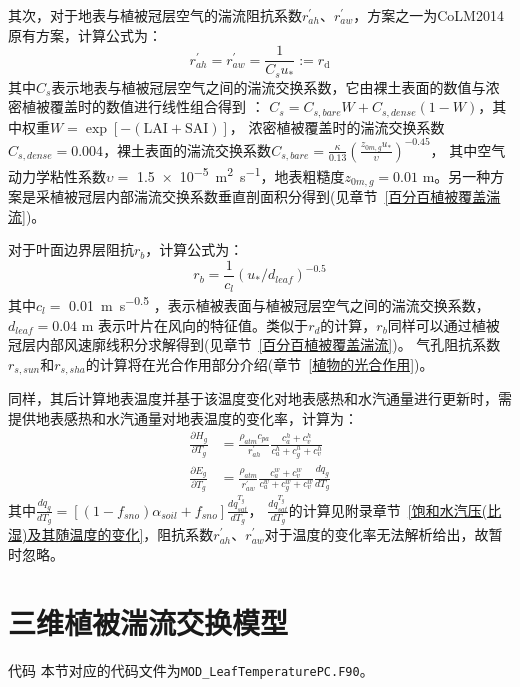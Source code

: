 其次，对于地表与植被冠层空气的湍流阻抗系数$r_{ah}^\prime$、$r_{aw}^\prime$，方案之一为CoLM2014原有方案，计算公式为：
\begin{equation}
r_{a h}^{\prime}=r_{a w}^{\prime}=\frac{1}{C_{s} u_{*}}:=r_{\mathrm{d}}
\end{equation}
其中$C_s$表示地表与植被冠层空气之间的湍流交换系数，它由裸土表面的数值与浓密植被覆盖时的数值进行线性组合得到 \citep{zeng2005vegetation}：
$C_s=C_{s,bare}W+C_{s,dense}\left(1-W\right)$，其中权重$W=\exp {\left[-(\text{LAI}+\text{SAI})\right]}$，
浓密植被覆盖时的湍流交换系数$C_{s,dense}=0.004$，裸土表面的湍流交换系数$C_{s,bare}=\frac{\kappa}{0.13}\left(\frac{z_{0m,g}u_\ast}{\upsilon}\right)^{-0.45}$，
其中空气动力学粘性系数$\upsilon=$ \qty{1.5e-5}{m^2.s^{-1}}，地表粗糙度$z_{0m,g}=0.01$ {m}。另一种方案是采植被冠层内部湍流交换系数垂直剖面积分得到(见章节~\ref{百分百植被覆盖湍流})。

对于叶面边界层阻抗$r_b$，计算公式为：
\begin{equation}
r_{b}=\frac{1}{c_{l}}\left(u_{*} / d_{{leaf }}\right)^{-0.5}
\end{equation}
其中$c_l=$ \qty{0.01}{m.s^{-0.5}} ，表示植被表面与植被冠层空气之间的湍流交换系数，$d_{leaf}=0.04$ m 表示叶片在风向的特征值。类似于$r_d$的计算，$r_b$同样可以通过植被冠层内部风速廓线积分求解得到(见章节~\ref{百分百植被覆盖湍流})。
气孔阻抗系数$r_{s,sun}$和$r_{s,sha}$的计算将在光合作用部分介绍(章节~\ref{植物的光合作用})。

同样，其后计算地表温度并基于该温度变化对地表感热和水汽通量进行更新时，需提供地表感热和水汽通量对地表温度的变化率，计算为：
\begin{align}
\frac{\partial H_{g}}{\partial T_{g}} & = \frac{\rho_{atm} c_{p a}}{r_{a h}^{\prime}} 
     \frac{c_{a}^{h}+c_{v}^{h}}{c_{a}^{h}+c_{g}^{h}+c_{v}^{h}} \\[2ex]
%
\frac{\partial E_{g}}{\partial T_{g}} & =
      \frac{\rho_{atm}}{r_{a w}^{\prime}} \frac{c_{a}^{w}+c_{v}^{w}}{c_{a}^{w}+c_{g}^{w}+c_{v}^{w}} \frac{d q_{g}}{d T_{g}}\label{Eg/Tg_2}
\end{align}
其中$\frac{dq_g}{dT_g}=\left[\left(1-f_{sno}\right)\alpha_{soil}+f_{sno}\right]\frac{dq_{sat}^{T_g}}{dT_g}$，
$\frac{dq_{sat}^{T_g}}{dT_g}$的计算见附录章节~\ref{饱和水汽压(比湿)及其随温度的变化}，阻抗系数$r_{ah}^\prime$、$r_{aw}^\prime$对于温度的变化率无法解析给出，故暂时忽略。


\section{三维植被湍流交换模型}
\begin{mymdframed}{代码}
本节对应的代码文件为\texttt{MOD\_LeafTemperaturePC.F90}。
\end{mymdframed}

